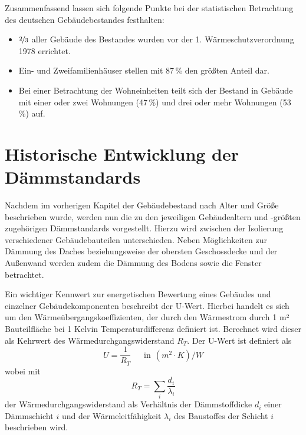 Zusammenfassend lassen sich folgende Punkte bei der statistischen Betrachtung des deutschen Gebäudebestandes festhalten:

\begin{itemize}
	\item $\nicefrac{2}{3}$ aller Gebäude des Bestandes wurden vor der 1. Wärmeschutzverordnung 1978 errichtet.
	\item Ein- und Zweifamilienhäuser stellen mit 87\,\% den größten Anteil dar.
	\item Bei einer Betrachtung der Wohneinheiten teilt sich der Bestand in Gebäude mit einer oder zwei Wohnungen (47\,\%) und drei oder mehr Wohnungen (53\,\%) auf.
\end{itemize}


\section{Historische Entwicklung der Dämmstandards}
\label{sec:Sektion 22}

Nachdem im vorherigen Kapitel der Gebäudebestand nach Alter und Größe beschrieben wurde, werden nun die zu den jeweiligen Gebäudealtern und -größten zugehörigen Dämmstandards vorgestellt. 
Hierzu wird zwischen der Isolierung verschiedener Gebäudebauteilen unterschieden. 
Neben Möglichkeiten zur Dämmung des Daches beziehungsweise der obersten Geschossdecke und der Außenwand werden zudem die Dämmung des Bodens sowie die Fenster betrachtet.

Ein wichtiger Kennwert zur energetischen Bewertung eines Gebäudes und einzelner Gebäudekomponenten beschreibt der U-Wert.
Hierbei handelt es sich um den Wärmeübergangskoeffizienten, der durch den Wärmestrom durch 1 m² Bauteilfläche bei 1 Kelvin Temperaturdifferenz definiert ist. 
Berechnet wird dieser als Kehrwert des Wärmedurchgangswiderstand \(R_T\). 
Der U-Wert ist definiert als
\begin{equation}
\label{eq:Gleichung221}
U = \frac{1}{R_T}  \ \ \ \ \ \ \ \text{in} \ \ (m^2 \cdot K)/W
\end{equation}
wobei mit
\begin{equation}
\label{eq:Gleichung222}
R_T = \sum \limits_{i} \frac{d_i}{\lambda_i}	
\end{equation}				%
der Wärmedurchgangswiderstand als Verhältnis der Dämmstoffdicke \(d_i\) einer Dämmschicht \(i\) und der Wärmeleitfähigkeit \(\lambda_i\) des Baustoffes der Schicht \(i\) beschrieben wird. 

